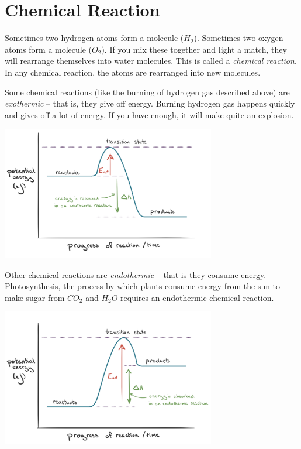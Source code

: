 \section{Chemical Reaction}

Sometimes two hydrogen atoms form a molecule ($H_2$). Sometimes two
oxygen atoms form a molecule ($O_2$). If you mix these
together and light a match, they will rearrange themselves into water
molecules. This is called a \textit{chemical reaction}.  In any
chemical reaction, the atoms are rearranged into new molecules.

Some chemical reactions (like the burning of hydrogen gas described
above) are \textit{exothermic} -- that is, they give off energy.
Burning hydrogen gas happens quickly and gives off a lot of energy. If
you have enough, it will make quite an explosion.

\includegraphics[width=0.7\textwidth]{KA_Exo.png}

Other chemical reactions are \textit{endothermic} -- that is they consume
energy.  Photosynthesis, the process by which plants consume energy
from the sun to make sugar from $CO_2$ and $H_2O$ requires an endothermic
chemical reaction.

\includegraphics[width=0.7\textwidth]{KA_Endo.png}

